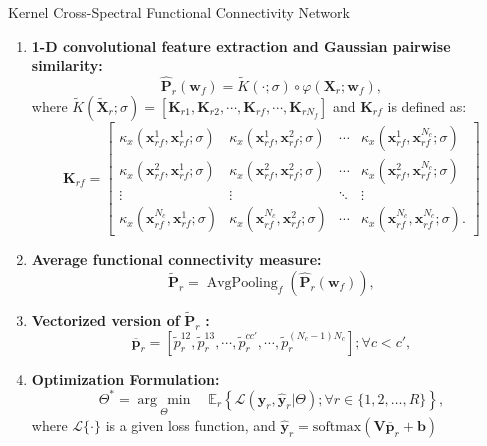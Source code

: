 \documentclass[aspectratio=169]{beamer}
\providecommand{\promeddd}[2]{\mathbb{E}_{#1}\!\left\{#2\right\}}%
\newcommand{\ve}[1]{\bm {#1}}
\newcommand{\mat}[1]{\bm {#1}}
\begin{document}
\begin{frame}[allowframebreaks]{Kernel Cross-Spectral Functional Connectivity Network}
    \begin{enumerate}
        \item \textbf{1-D convolutional feature extraction and Gaussian pairwise similarity:}
        \[
            \hat{\mat{P}}_{r}(\ve{w}_f)  = \tilde{K}(\cdot;\sigma) \circ \varphi(\mat{X}_r; \ve{w}_f), 
        \]
        where $\tilde{K}(\mat{\tilde{X}}_r;\sigma) = \left[ \mat{K}_{r1} , \mat{K}_{r2}, \cdots,\mat{K}_{rf},\cdots, \mat{K}_{rN_f} \right]$ and  $\mat{K}_{rf}$ is defined as:
        \[
            \mat{K}_{rf} = \begin{bmatrix}
                \kappa_{x}(\ve{x}^{1}_{rf}, \ve{x}^{1}_{rf}; \sigma) & \kappa_{x}(\ve{x}^{1}_{rf}, \ve{x}^{2}_{rf}; \sigma) & \cdots & \kappa_{x}(\ve{x}^{1}_{rf}, \ve{x}^{N_c}_{rf}; \sigma) \\
                \kappa_{x}(\ve{x}^{2}_{rf}, \ve{x}^{1}_{rf}; \sigma) & \kappa_{x}(\ve{x}^{2}_{rf}, \ve{x}^{2}_{rf}; \sigma) & \cdots & \kappa_{x}(\ve{x}^{2}_{rf}, \ve{x}^{N_c}_{rf}; \sigma) \\
                \vdots & \vdots & \ddots & \vdots \\
                \kappa_{x}(\ve{x}^{N_c}_{rf}, \ve{x}^{1}_{rf}; \sigma) & \kappa_{x}(\ve{x}^{N_c}_{rf}, \ve{x}^{2}_{rf}; \sigma) & \cdots & \kappa_{x}(\ve{x}^{N_c}_{rf}, \ve{x}^{N_c}_{rf}; \sigma).
            \end{bmatrix}
        \]
        \item \textbf{Average functional connectivity measure:}
        \[
            \tilde{\mat{P}}_r  = \operatorname{AvgPooling}_{f} \left(\hat{\mat{P}}_{r}(\ve{w}_f)\right),
        \]
        \item \textbf{Vectorized version of} $\tilde{\mat{P}}_r$ \textbf{:}
        \[
            \overline{\ve{p}}_r = \left[\tilde{p}_r^{12}, \tilde{p}_r^{13}, \cdots, \tilde{p}_r^{cc'}, \cdots, \tilde{p}_r^{(N_c-1) N_c} \right]; \forall c<c',
        \]
        \item \textbf{Optimization Formulation:}
        \[
            \Theta^{*} = \underset{\Theta}{\arg\,\min} \quad \promeddd{r}{\mathcal{L}(\ve{y}_r,\hat{\ve{y}}_r|\Theta); \forall r\in\{1,2,\dots,R\}},
        \]
        where $\mathcal{L} \{\cdot\}$ is a given loss function, and $\hat{\ve{y}}_r = \mathrm{softmax}\left(\mat{V}\overline{\ve{p}}_r + \ve{b}\right)$
    \end{enumerate}
\end{frame}
\end{document}
